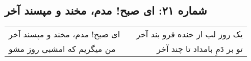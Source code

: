 \begin{center}
\section*{شماره ۲۱: ای صبح! مدم، مخند و مپسند آخر}
\label{sec:021}
\begin{longtable}{l p{0.5cm} r}
ای صبح! مدم، مخند و مپسند آخر
&&
یک روز لب از خنده فرو بند آخر
\\
من میگریم که امشبی روز مشو
&&
تو بر دَمِ بامداد تا چند آخر
\\
\end{longtable}
\end{center}
